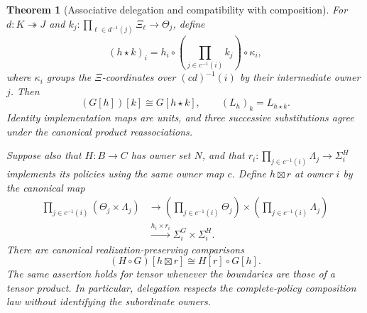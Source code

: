 \documentclass[11pt,a4paper]{article}
\numberwithin{equation}{section}
\newtheorem{theorem}{Theorem}[section]
\theoremstyle{definition}
\theoremstyle{remark}
\theoremstyle{plain}
\begin{document}
\begin{theorem}[Associative delegation and compatibility with composition]
\label{thm:egt-delegation-substitution}
For $d:K\twoheadrightarrow J$ and
$k_j:\prod_{\ell\in d^{-1}(j)}\Xi_\ell\to\Theta_j$, define
\[
 (h\star k)_i
 =h_i\circ\left(\prod_{j\in c^{-1}(i)}k_j\right)\circ\kappa_i,
\]
where $\kappa_i$ groups the $\Xi$-coordinates over $(cd)^{-1}(i)$
by their intermediate owner $j$. Then
\[
 (G[h])[k]\cong G[h\star k],\qquad
 (L_h)_k=L_{h\star k}.
\]
Identity implementation maps are units, and three successive substitutions
agree under the canonical product reassociations.

Suppose also that $H:B\to C$ has owner set $N$, and that
$r_i:\prod_{j\in c^{-1}(i)}\Lambda_j\to\Sigma_i^H$ implements
its policies using the same owner map $c$. Define $h\boxtimes r$ at owner
$i$ by the canonical map
\[
 \begin{aligned}
 \prod_{j\in c^{-1}(i)}(\Theta_j\times\Lambda_j)
 &\longrightarrow
 \left(\prod_{j\in c^{-1}(i)}\Theta_j\right)
 \times\left(\prod_{j\in c^{-1}(i)}\Lambda_j\right)\\
 &\xrightarrow{h_i\times r_i}\Sigma_i^G\times\Sigma_i^H.
 \end{aligned}
\]
There are canonical realization-preserving comparisons
\[
 (H\circ G)[h\boxtimes r]\cong H[r]\circ G[h].
\]
The same assertion holds for tensor whenever the boundaries are those of
a tensor product. In particular, delegation respects the complete-policy
composition law without identifying the subordinate owners.
\end{theorem}
\end{document}
